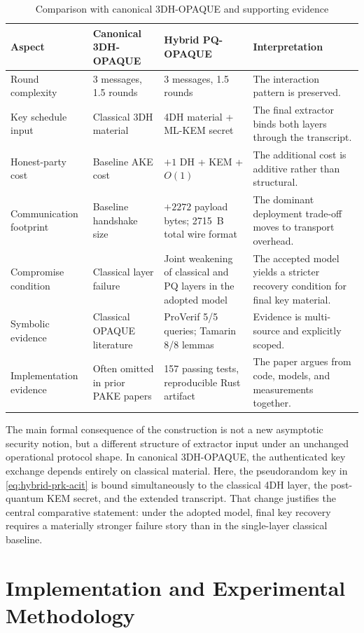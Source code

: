 \documentclass[conference]{IEEEtran}
\begin{document}
\begin{table}[t]
\caption{Comparison with canonical 3DH-OPAQUE and supporting evidence}
\label{tab:acit-comparison}
\centering
\footnotesize
\begin{tabularx}{\textwidth}{@{}L{3.0cm}L{3.0cm}L{3.1cm}Y@{}}
\toprule
Aspect & Canonical 3DH-OPAQUE & Hybrid PQ-OPAQUE & Interpretation \\
\midrule
Round complexity & 3 messages, 1.5 rounds & 3 messages, 1.5 rounds & The interaction pattern is preserved. \\
Key schedule input & Classical 3DH material & 4DH material + ML-KEM secret & The final extractor binds both layers through the transcript. \\
Honest-party cost & Baseline AKE cost & $+1$ DH + KEM + $O(1)$ & The additional cost is additive rather than structural. \\
Communication footprint & Baseline handshake size & $+2272$ payload bytes; 2715~B total wire format & The dominant deployment trade-off moves to transport overhead. \\
Compromise condition & Classical layer failure & Joint weakening of classical and PQ layers in the adopted model & The accepted model yields a stricter recovery condition for final key material. \\
Symbolic evidence & Classical OPAQUE literature & ProVerif 5/5 queries; Tamarin 8/8 lemmas & Evidence is multi-source and explicitly scoped. \\
Implementation evidence & Often omitted in prior PAKE papers & 157 passing tests, reproducible Rust artifact & The paper argues from code, models, and measurements together. \\
\bottomrule
\end{tabularx}
\end{table}

The main formal consequence of the construction is not a new asymptotic security notion, but a different structure of extractor input under an unchanged operational protocol shape. In canonical 3DH-OPAQUE, the authenticated key exchange depends entirely on classical material. Here, the pseudorandom key in \eqref{eq:hybrid-prk-acit} is bound simultaneously to the classical 4DH layer, the post-quantum KEM secret, and the extended transcript. That change justifies the central comparative statement: under the adopted model, final key recovery requires a materially stronger failure story than in the single-layer classical baseline.

\section{Implementation and Experimental Methodology}
\end{document}
